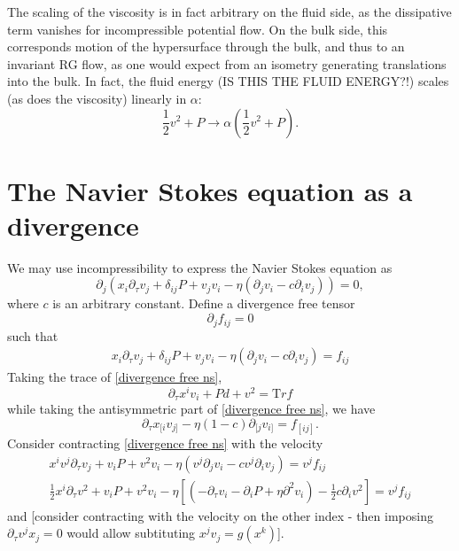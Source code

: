 \documentclass[12pt,a4paper]{article}
\begin{document}
The scaling of the viscosity is in fact arbitrary on the fluid side, as the dissipative term vanishes for incompressible potential flow. On the bulk side, this corresponds motion of the hypersurface through the bulk, and thus to an invariant RG flow, as one would expect from an isometry generating translations into the bulk. In fact, the fluid energy (IS THIS THE FLUID ENERGY?!) scales (as does the viscosity) linearly in $\alpha$:
\begin{equation}
\frac{1}{2} v^2 + P		\rightarrow		\alpha \left( \frac{1}{2} v^2 +P \right)		.
\end{equation}

\section{The Navier Stokes equation as a divergence}

We may use incompressibility to express the Navier Stokes equation as
\begin{equation}
\partial_j		(		x_i \partial_\tau v_j		+		\delta_{ij} P		+		v_j v_i		-		\eta ( \partial_j v_i		-		c \partial_i v_j		)	)		=			0		,
\end{equation}
where $c$ is an arbitrary constant. Define a divergence free tensor
\begin{equation}
\partial_j f_{ij}		=		0
\end{equation}
such that
\begin{gather}
x_i \partial_\tau v_j		+		\delta_{ij} P		+		v_j v_i		-		\eta ( \partial_j v_i - c \partial_i v_j )		=			f_{ij}
\label{divergence free ns}
\end{gather}
Taking the trace of \eqref{divergence free ns},
\begin{equation}
\partial_\tau x^i v_i		+		P d		+		v^2		=		\mathrm Tr f
\label{trace of divergence free ns}
\end{equation}
while taking the antisymmetric part of \eqref{divergence free ns}, we have
\begin{equation}
\partial_\tau x_{ [i } v_{ j] }		-		\eta ( 1 - c ) \partial_{ [j } v_{ i]}		=		f_{ [ij] }		.
\label{antisymmetric part of divergence free ns}
\end{equation}
Consider contracting \eqref{divergence free ns} with the velocity
\begin{align}
x^i v^j \partial_\tau v_j		+		v_i P		+		v^2 v_i		-		\eta ( v^j \partial_j v_i		-		c v^j \partial_i v_j )		=		v^j f_{ij}
\\
\frac{1}{2} x^i \partial_\tau v^2		+		v_i P		+		v^2 v_i		-		\eta
	\left[
		( - \partial_\tau v_i		-		\partial_i P		+		\eta \partial^2 v_i )		-		\frac{1}{2} c \partial_i v^2
	\right]
	=		v^j f_{ij}
\label{velocity dot divergence free ns}
\end{align}
and [consider contracting with the velocity on the other index - then imposing $\partial_\tau v^j x_j = 0$ would allow subtituting $x^j v_j = g(x^k)$].
\end{document}
